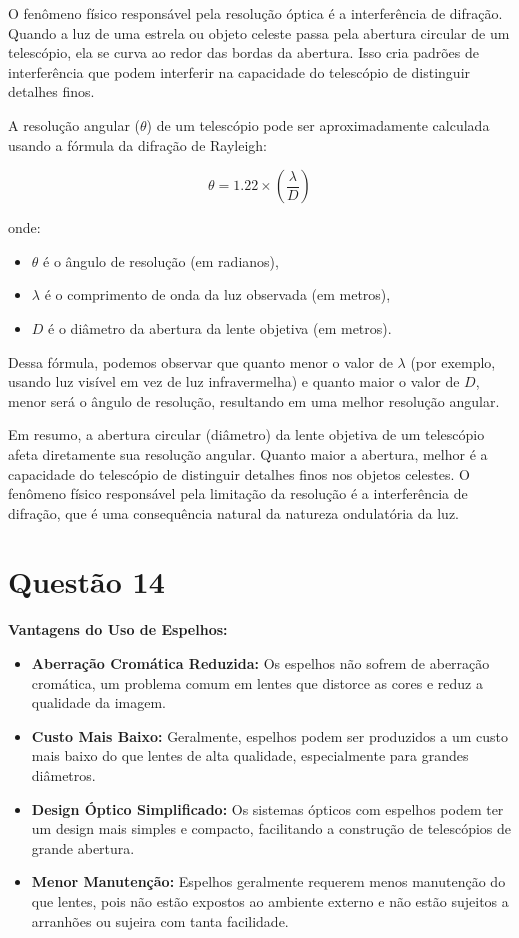 \documentclass[a4paper, 12pt]{article}
\begin{document}
O fenômeno físico responsável pela resolução óptica é a interferência de difração. Quando a luz de uma estrela ou objeto celeste passa pela abertura circular de um telescópio, ela se curva ao redor das bordas da abertura. Isso cria padrões de interferência que podem interferir na capacidade do telescópio de distinguir detalhes finos.

A resolução angular (\(\theta\)) de um telescópio pode ser aproximadamente calculada usando a fórmula da difração de Rayleigh:

\[
\theta = 1.22 \times \left( \frac{\lambda}{D} \right)
\]

onde:
\begin{itemize}
    \item \( \theta \) é o ângulo de resolução (em radianos),
    \item \( \lambda \) é o comprimento de onda da luz observada (em metros),
    \item \( D \) é o diâmetro da abertura da lente objetiva (em metros).
\end{itemize}

Dessa fórmula, podemos observar que quanto menor o valor de \( \lambda \) (por exemplo, usando luz visível em vez de luz infravermelha) e quanto maior o valor de \( D \), menor será o ângulo de resolução, resultando em uma melhor resolução angular.

Em resumo, a abertura circular (diâmetro) da lente objetiva de um telescópio afeta diretamente sua resolução angular. Quanto maior a abertura, melhor é a capacidade do telescópio de distinguir detalhes finos nos objetos celestes. O fenômeno físico responsável pela limitação da resolução é a interferência de difração, que é uma consequência natural da natureza ondulatória da luz.

\section*{Questão 14}
\textbf{Vantagens do Uso de Espelhos:}
\begin{itemize}
    \item \textbf{Aberração Cromática Reduzida:} Os espelhos não sofrem de aberração cromática, um problema comum em lentes que distorce as cores e reduz a qualidade da imagem.
    \item \textbf{Custo Mais Baixo:} Geralmente, espelhos podem ser produzidos a um custo mais baixo do que lentes de alta qualidade, especialmente para grandes diâmetros.
    \item \textbf{Design Óptico Simplificado:} Os sistemas ópticos com espelhos podem ter um design mais simples e compacto, facilitando a construção de telescópios de grande abertura.
    \item \textbf{Menor Manutenção:} Espelhos geralmente requerem menos manutenção do que lentes, pois não estão expostos ao ambiente externo e não estão sujeitos a arranhões ou sujeira com tanta facilidade.
\end{itemize}
\end{document}
